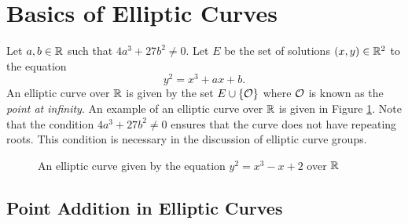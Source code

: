 \section{Basics of Elliptic Curves}
\label{scn:ECC}

Let $a, b \in \mathbb{R}$ such that $4a^3 + 27b^2 \neq 0$. Let $E$ be the set of solutions $(x,y) \in \mathbb{R}^2$ to the equation
\begin{equation}
    y^2 = x^3 + ax + b.
\end{equation}
An elliptic curve over $\mathbb{R}$ is given by the set $E \cup \{\mathcal{O}\}$ where $\mathcal{O}$ is known as the \textit{point at infinity}.
An example of an elliptic curve over $\mathbb{R}$ is given in Figure \ref{fig:ecc}.
Note that the condition $4a^3 + 27b^2 \neq 0$ ensures that the curve does not have repeating roots.
This condition is necessary in the discussion of elliptic curve groups.


\begin{figure}
    \begin{center}
        \caption{An elliptic curve given by the equation $y^2 = x^3 - x + 2$ over $\mathbb{R}$}
        \label{fig:ecc}
    \end{center}
\end{figure}

\subsection{Point Addition in Elliptic Curves}

